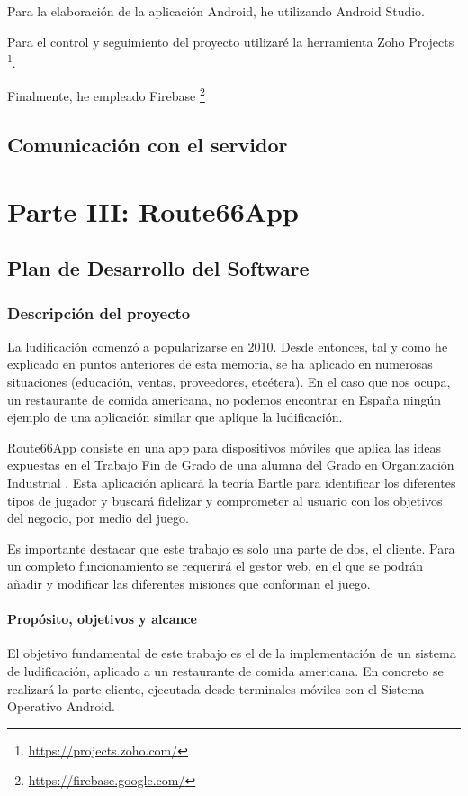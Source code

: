 \documentclass[twoside]{report}
\begin{document}
Para la elaboración de la aplicación Android, he utilizando Android Studio.

Para el control y seguimiento del proyecto utilizaré la herramienta Zoho Projects \footnote{\url{https://projects.zoho.com/}}.

Finalmente, he empleado Firebase \footnote{\url{https://firebase.google.com/}}

\section{Comunicación con el servidor}

\chapter{Parte III: Route66App}
\section{Plan de Desarrollo del Software}
\subsection{Descripción del proyecto}
La ludificación comenzó a popularizarse en 2010\cite{anatfg}. Desde entonces, tal y como he explicado en puntos anteriores de esta memoria, se ha aplicado en numerosas situaciones (educación, ventas, proveedores, etcétera). En el caso que nos ocupa, un restaurante de comida americana, no podemos encontrar en España ningún ejemplo de una aplicación similar que aplique la ludificación.

Route66App consiste en una app para dispositivos móviles que aplica las ideas expuestas en el Trabajo Fin de Grado de una alumna del Grado en Organización Industrial \cite{cristinatfg}. Esta aplicación aplicará la teoría Bartle para identificar los diferentes tipos de jugador y buscará fidelizar y comprometer al usuario con los objetivos del negocio, por medio del juego.

Es importante destacar que este trabajo es solo una parte de dos, el cliente. Para un completo funcionamiento se requerirá el gestor web, en el que se podrán añadir y modificar las diferentes misiones que conforman el juego.
 
\subsubsection{Propósito, objetivos y alcance}

El objetivo fundamental de  este trabajo es el de la implementación de un sistema de ludificación, aplicado a un restaurante de comida americana. En concreto se realizará la parte cliente, ejecutada desde terminales móviles con el Sistema Operativo Android.
\end{document}
